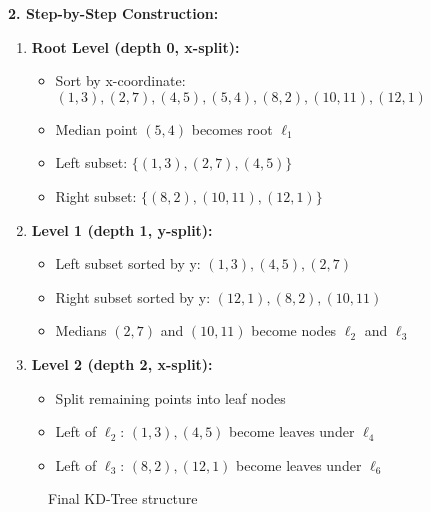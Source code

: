 \textbf{2. Step-by-Step Construction:}
\begin{enumerate}[leftmargin=*,noitemsep]
    \item \textbf{Root Level (depth 0, x-split):}
    \begin{itemize}[noitemsep]
        \item Sort by x-coordinate: $(1,3), (2,7), (4,5), (5,4), (8,2), (10,11), (12,1)$
        \item Median point $(5,4)$ becomes root $\ell_1$
        \item Left subset: $\{(1,3), (2,7), (4,5)\}$
        \item Right subset: $\{(8,2), (10,11), (12,1)\}$
    \end{itemize}

    \item \textbf{Level 1 (depth 1, y-split):}
    \begin{itemize}[noitemsep]
        \item Left subset sorted by y: $(1,3), (4,5), (2,7)$
        \item Right subset sorted by y: $(12,1), (8,2), (10,11)$
        \item Medians $(2,7)$ and $(10,11)$ become nodes $\ell_2$ and $\ell_3$
    \end{itemize}

    \item \textbf{Level 2 (depth 2, x-split):}
    \begin{itemize}[noitemsep]
        \item Split remaining points into leaf nodes
        \item Left of $\ell_2$: $(1,3), (4,5)$ become leaves under $\ell_4$
        \item Left of $\ell_3$: $(8,2), (12,1)$ become leaves under $\ell_6$
    \end{itemize}
\end{enumerate}

\begin{figure}[H]
    \centering
    \caption*{Final KD-Tree structure}
\end{figure}

